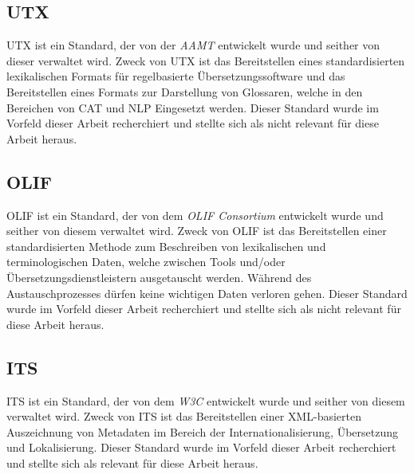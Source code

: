 \subsection{UTX}
\ac{UTX} ist ein Standard, der von der  \textit{\ac{AAMT}} entwickelt wurde und seither von dieser verwaltet wird. Zweck von \ac{UTX} ist das Bereitstellen eines standardisierten lexikalischen Formats für regelbasierte Übersetzungssoftware und das Bereitstellen eines Formats zur Darstellung von Glossaren, welche in den Bereichen von \ac{CAT} und \ac{NLP} Eingesetzt werden. Dieser Standard wurde im Vorfeld dieser Arbeit recherchiert und stellte sich als nicht relevant für diese Arbeit heraus.
\autocite[Vgl.][S. 4]{AAMT.2018}
\subsection{OLIF}
\ac{OLIF} ist ein Standard, der von dem \textit{\ac{OLIF} Consortium} entwickelt wurde und seither von diesem verwaltet wird. Zweck von \ac{OLIF} ist das Bereitstellen einer standardisierten Methode zum Beschreiben von lexikalischen und terminologischen Daten, welche zwischen Tools und/oder Übersetzungsdienstleistern ausgetauscht werden. Während des Austauschprozesses dürfen keine wichtigen Daten verloren gehen. Dieser Standard wurde im Vorfeld dieser Arbeit recherchiert und stellte sich als nicht relevant für diese Arbeit heraus.
\autocite[Vgl.][]{McCormick.2002}
\subsection{ITS}
\ac{ITS} ist ein Standard, der von dem \textit{\ac{W3C}} entwickelt wurde und seither von diesem verwaltet wird. Zweck von \ac{ITS} ist das Bereitstellen einer \ac{XML}-basierten Auszeichnung von Metadaten im Bereich der Internationalisierung, Übersetzung und Lokalisierung. Dieser Standard wurde im Vorfeld dieser Arbeit recherchiert und stellte sich als relevant für diese Arbeit heraus.
\autocite[Vgl.][]{Filip.2013}